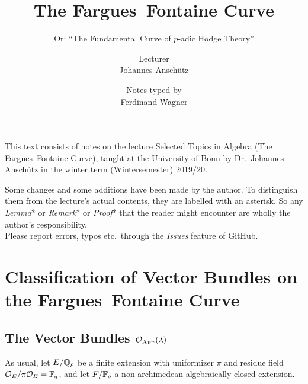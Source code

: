 \documentclass[a4paper, 10pt, oneside, DIV=9, chapterprefix=true, numbers=enddot,bibliography=totoc]{scrbook}
\title{The Fargues--Fontaine Curve}
\subtitle{Or: \enquote{The Fundamental Curve of $p$-adic Hodge Theory}}
\author{{\normalsize Lecturer}\\
	Johannes Anschütz}
\date{{\normalsize Notes typed by}\\
	Ferdinand Wagner}
\begin{document}
\frontmatter
{}
\maketitle
\noindent This text consists of notes on the lecture Selected Topics in Algebra (The Fargues--Fontaine Curve), taught at the University of
Bonn by Dr.\ Johannes Anschütz in the winter term (Wintersemester) 2019/20.

Some changes and some additions have been made by the author. To distinguish them from the lecture's actual contents, they are labelled with an asterisk. So any \emph{Lemma}* or \emph{Remark}* or \emph{Proof}* that the reader might encounter are wholly the author's responsibility.\\[\thmsep]Please report errors, typos etc.\ through the \emph{Issues} feature of GitHub.


\tableofcontents
{}
\setcounter{llecture}{-1}


\mainmatter{}
\renewcommand{\thedummy}{\thesection.\arabic{dummy}}






\chapter{Classification of Vector Bundles on the Fargues--Fontaine Curve}
\section{The Vector Bundles \texorpdfstring{$\mathcal{O}_{X_{\mathrm{FF}}}(\lambda)$}{OX(lambda)}}
As usual, let $E/\mathbb{Q}_p$ be a finite extension with uniformizer $\pi$ and residue field $\mathcal{O}_E/\pi \mathcal{O}_E=\mathbb{F}_q$, and let $F/\mathbb{F}_q$ a non-archimedean algebraically closed extension. 
\end{document}
